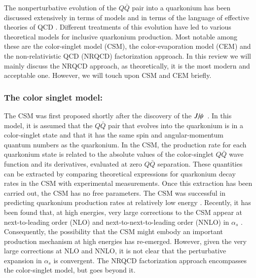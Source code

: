 The nonperturbative evolution of the $Q\bar Q$ pair into a quarkonium
has been discussed extensively in terms of models and in terms of the
language of effective theories of QCD
\cite{Bodwin:1994jh,Brambilla:2004wf}. Different
treatments of this evolution have led to various theoretical models for
inclusive quarkonium production. Most notable among these are the color-singlet
model (CSM), the color-evaporation model (CEM) and the non-relativistic QCD
(NRQCD) factorization approach. In this review we will mainly discuss the NRQCD 
approach, as theoretically, it is the most modern and acceptable one. However,
we will touch upon CSM and CEM briefly. 


\subsubsection{The color singlet model:}

The CSM was first proposed shortly after the discovery of the 
$J\hspace{-.08em}/\hspace{-.14em}\psi$~\cite{Einhorn:1975ua,Ellis:1976fj,Carlson:1976cd,Berger:1980ni}.
In this model, it is assumed that the $Q\bar Q$ pair that evolves into
the quarkonium is in a color-singlet state and that it has the same spin
and angular-momentum quantum numbers as the quarkonium. In the CSM, the
production rate for each quarkonium state is related to the absolute
values of the color-singlet $Q\bar Q$ wave function and its derivatives,
evaluated at zero $Q\bar Q$ separation. These quantities can be
extracted by comparing theoretical expressions for quarkonium decay
rates in the CSM with experimental measurements. Once this extraction
has been carried out, the CSM has no free parameters. The CSM was
successful in predicting quarkonium production rates at relatively low
energy \cite{Schuler:1994hy}. Recently, it has been found that, at high
energies, very large corrections to the CSM appear at next-to-leading
order (NLO) and next-to-next-to-leading order (NNLO) in $\alpha_s$
\cite{Artoisenet:2007xi,Campbell:2007ws,Artoisenet:2008fc}.
Consequently, the possibility that the CSM might embody an important 
production mechanism at high energies has re-emerged. 
However, given the very large corrections at
NLO and NNLO, it is not clear that the perturbative expansion in
$\alpha_s$ is convergent. 
The NRQCD factorization approach encompasses
the color-singlet model, but goes beyond it.

